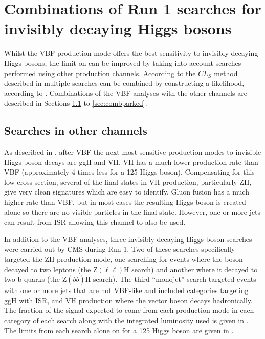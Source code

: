 \chapter{Combinations of Run 1 searches for invisibly decaying Higgs bosons}
\label{chap:comb}
Whilst the \ac{VBF} production mode offers the best sensitivity to invisibly decaying Higgs bosons, the limit on \BRinv can be improved by taking into account searches performed using other production channels. According to the $CL_{S}$ method described in  multiple searches can be combined by constructing a likelihood, according to . Combinations of the \ac{VBF} analyses with the other channels are described in Sections \ref{sec:combotherchannels} to \ref{sec:combparked}. 


\section{Searches in other channels}
\label{sec:combotherchannels}
As described in , after \ac{VBF} the next most sensitive production modes to invisible Higgs boson decays are \ac{ggH} and \ac{VH}. \ac{VH} has a much lower production rate than \ac{VBF} (approximately 4 times less for a 125 \GeV Higgs boson). Compensating for this low cross-section, several of the final states in \ac{VH} production, particularly \ac{ZH}, give very clean signatures which are easy to identify. Gluon fusion has a much higher rate than \ac{VBF}, but in most cases the resulting Higgs boson is created alone so there are no visible particles in the final state. However, one or more jets can result from \ac{ISR} allowing this channel to also be used. 

In addition to the \ac{VBF} analyses, three invisibly decaying Higgs boson searches were carried out by CMS during Run 1. Two of these searches specifically targeted the \ac{ZH} production mode, one searching for events where the \PZ boson decayed to two leptons (the Z$(\ell\ell)$H search) and another where it decayed to two b quarks (the Z$(b\bar{b})$H search). The third ``monojet'' search targeted events with one or more jets that are not \ac{VBF}-like and included categories targeting \ac{ggH} with \ac{ISR}, and \ac{VH} production where the vector boson decays hadronically. The fraction of the signal expected to come from each production mode in each category of each search along with the integrated luminosity used is given in . The limits from each search alone on \BRinv for a 125 \GeV Higgs boson are given in .

